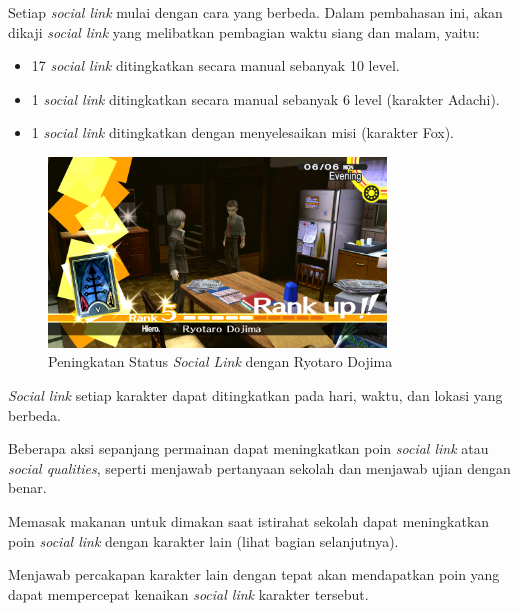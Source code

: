 \begin{enumerate}
    {\item Setiap \textit{social link} mulai dengan cara yang berbeda. Dalam pembahasan ini, akan dikaji \textit{social link} yang melibatkan pembagian waktu siang dan malam, yaitu:
          \begin{itemize}
              \item 17 \textit{social link} ditingkatkan secara manual sebanyak 10 level.
              \item 1 \textit{social link} ditingkatkan secara manual sebanyak 6 level (karakter Adachi).
              \item 1 \textit{social link} ditingkatkan dengan menyelesaikan misi (karakter Fox).
          \end{itemize}
          }
          \begin{figure}[htbp]
              \centering
              \includegraphics[width=0.8\textwidth]{resources/Dokumentasi/Screenshot (402).png}
              \caption{\label{dojima}Peningkatan Status \textit{Social Link} dengan Ryotaro Dojima}
          \end{figure}
    \item \textit{Social link} setiap karakter dapat ditingkatkan pada hari, waktu, dan lokasi yang berbeda.
    \item Beberapa aksi sepanjang permainan dapat meningkatkan poin \textit{social link} atau \textit{social qualities}, seperti menjawab pertanyaan sekolah dan menjawab ujian dengan benar.
    \item Memasak makanan untuk dimakan saat istirahat sekolah dapat meningkatkan poin \textit{social link} dengan karakter lain (lihat bagian selanjutnya).
    \item Menjawab percakapan karakter lain dengan tepat akan mendapatkan poin yang dapat mempercepat kenaikan \textit{social link} karakter tersebut.
\end{enumerate}


